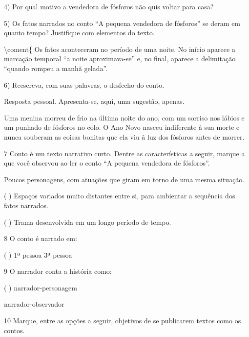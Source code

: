 \begin{itemize}
\begin{itemize}

4) Por qual motivo a vendedora de fósforos não quis voltar para casa?



5) Os fatos narrados no conto ``A pequena vendedora de fósforos'' se
deram em quanto tempo? Justifique com elementos do texto.

\textbackslash{}coment\{ Os fatos aconteceram no período de uma noite.
No início aparece a marcação temporal ``a noite aproximava-se'' e, no
final, aparece a delimitação ``quando rompeu a manhã gelada''.


6) Reescreva, com suas palavras, o desfecho do conto.

Resposta pessoal. Apresenta-se, aqui, uma sugestão, apenas.

Uma menina morreu de frio na última noite do ano, com um sorriso nos
lábios e um punhado de fósforos no colo. O Ano Novo nasceu indiferente à
sua morte e nunca souberam as coisas bonitas que ela viu à luz dos
fósforos antes de morrer.


\num{7} Conto é um texto narrativo curto. Dentre as características a seguir,
marque a que você observou ao ler o conto ``A pequena vendedora de
fósforos''.

 Poucos personagens, com atuações que giram em torno de uma mesma
situação.

( ) Espaços variados muito distantes entre si, para ambientar a
sequência dos fatos narrados.

( ) Trama desenvolvida em um longo período de tempo.

\num{8} O conto é narrado em:

( ) 1ª pessoa  3ª pessoa

\num{9} O narrador conta a história como:


( ) narrador-personagem

 narrador-observador

\num{10} Marque, entre as opções a seguir, objetivos de se publicarem textos
como os contos.


\end{itemize}
\end{itemize}
